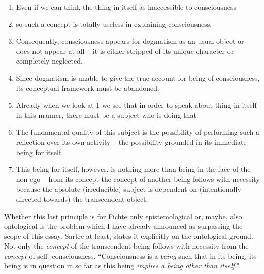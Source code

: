 \begin{enumerate}
\item Even if we can think the thing-in-itself as inaccessible to consciousness
\item so such a concept  is totally useless in explaining consciousness.
\item Consequently, consciousness appears for dogmatism as an usual object or does not appear at all -- it is either 
stripped of its unique character or completely neglected.
\item Since dogmatism is unable to give the true account for being of consciousness, its conceptual framework 
must be abandoned.
\item Already when we look at 1 we see that in order to speak about thing-in-itself in this manner, there must be 
a subject who is doing that.
\item The fundamental quality of this subject is the possibility of performing such a reflection over its own 
activity -- the possibility grounded in its immediate being for itself.
\item This being for itself, however, is nothing more than being in the face of the non-ego -- from its concept the 
concept of another being follows with necessity because the absolute (irreducible) subject is dependent on 
(intentionally directed towards) the transcendent object.
\end{enumerate}
Whether this last principle is for Fichte only epistemological or, maybe, also ontological is the problem which I 
have already announced as surpassing the scope of this essay. Sartre at least, states it explicitly on the ontological 
ground. Not only the {\em concept} of the transcendent being follows with necessity from 
the {\em concept} of self-
consciousness. ``Consciousness is a {\em being} such that in its being, its being is in question in so far as this being {\em implies a being other than itself}." \cite{BN}   

